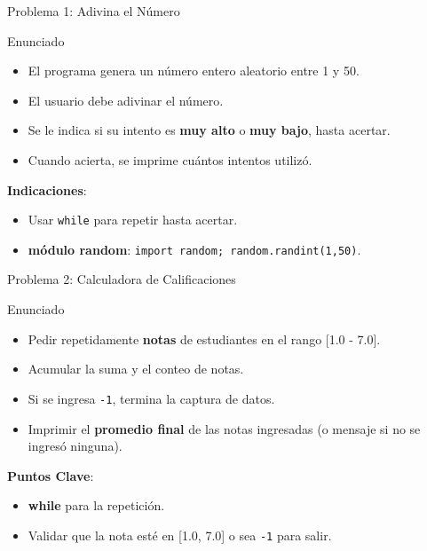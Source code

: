 \documentclass[10pt]{beamer}
\begin{document}
\begin{frame}{Problema 1: Adivina el Número}
  \begin{block}{Enunciado}
    \begin{itemize}
      \item El programa genera un número entero aleatorio entre 1 y 50.
      \item El usuario debe adivinar el número.
      \item Se le indica si su intento es \textbf{muy alto} o \textbf{muy bajo}, hasta acertar.
      \item Cuando acierta, se imprime cuántos intentos utilizó.
    \end{itemize}
  \end{block}
  \textbf{Indicaciones}:
  \begin{itemize}
    \item Usar \texttt{while} para repetir hasta acertar.
    \item \textbf{módulo random}: \texttt{import random; random.randint(1,50)}.
  \end{itemize}
\end{frame}

\begin{frame}{Problema 2: Calculadora de Calificaciones}
  \begin{block}{Enunciado}
    \begin{itemize}
      \item Pedir repetidamente \textbf{notas} de estudiantes en el rango [1.0 - 7.0].
      \item Acumular la suma y el conteo de notas.
      \item Si se ingresa \texttt{-1}, termina la captura de datos.
      \item Imprimir el \textbf{promedio final} de las notas ingresadas (o mensaje si no se ingresó ninguna).
    \end{itemize}
  \end{block}
  \textbf{Puntos Clave}:
  \begin{itemize}
    \item \textbf{while} para la repetición.
    \item Validar que la nota esté en [1.0, 7.0] o sea \texttt{-1} para salir.
  \end{itemize}
\end{frame}
\end{document}
